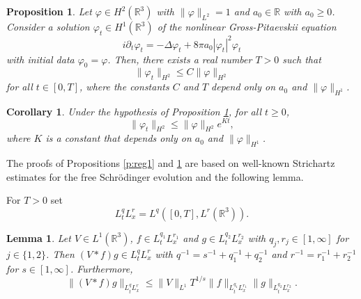 \documentclass[11pt,a4paper]{scrartcl}
\newtheorem{cor}[thm]{Corollary}
\newtheorem{prp}[thm]{Proposition}
\newtheorem{lem}[thm]{Lemma}
\newcommand{\R}{\mathds{R}}
\begin{document}
\begin{prp}
  \label{p:reg2}
  Let $\varphi \in H^2(\R^3)$ with $\| \varphi \|_{L^2} = 1$ and $a_0 \in \R$
  with $a_0 \ge 0$. Consider a solution $\varphi_t \in H^1(\R^3)$ of the
  nonlinear Gross-Pitaevskii equation
  \begin{displaymath}
    i \partial_t \varphi_t = - \Delta \varphi_t + 8 \pi a_0 |\varphi_t|^2
    \varphi_t
  \end{displaymath}
  with initial data $\varphi_0 = \varphi$. Then, there exists a real number $T
  > 0$ such that
  \begin{displaymath}
    \| \varphi_t \|_{H^2} \le C \| \varphi \|_{H^2}
  \end{displaymath}
  for all $t \in [0,T]$, where the constants $C$ and $T$ depend only on $a_0$
  and $\| \varphi \|_{H^1}$.
\end{prp}


\begin{cor}
  \label{c:reg2}
  Under the hypothesis of Proposition \ref{p:reg2}, for all $t \ge 0$,
  \begin{displaymath}
    \| \varphi_t \|_{H^2} \le \| \varphi \|_{H^2} e^{Kt},
  \end{displaymath}
  where $K$ is a constant that depends only on $a_0$ and $\| \varphi
  \|_{H^1}$.
\end{cor}


The proofs of Propositions \ref{p:reg1} and \ref{p:reg2} are based on
well-known Strichartz estimates for the free Schr\"odinger evolution and the
following lemma.


For $T > 0$ set
\begin{displaymath}
  L_t^q L_x^r = L^q([0,T], L^r(\R^3)).
\end{displaymath}


\begin{lem}
  \label{l:interp}
  Let $V \in L^1(\R^3)$, $f \in L_t^{q_1} L_x^{r_1}$ and $g \in L_t^{q_2}
  L_x^{r_2}$ with $q_j, r_j \in [1,\infty]$ for $j \in \{1,2\}$. Then $(V * f)
  g \in L_t^q L_x^r$ with $q^{-1} = s^{-1} + q_1^{-1} + q_2^{-1}$ and $r^{-1}
  = r_1^{-1} + r_2^{-1}$ for $s \in [1, \infty]$. Furthermore,
  \begin{displaymath}
    \| (V * f)g \|_{L_t^q L_x^r} \le \| V \|_{L^1} T^{1/s} \| f \|_{L_t^{q_1}
    L_x^{r_1}} \| g \|_{L_t^{q_2} L_x^{r_2}}.
  \end{displaymath}
\end{lem}
\end{document}
